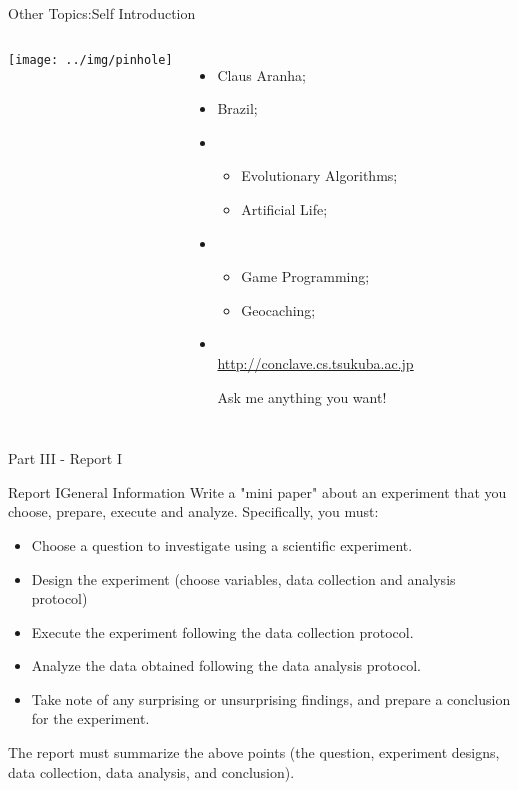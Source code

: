 \documentclass[aspectratio=169]{beamer}
\begin{document}
\begin{frame}{Other Topics:}{Self Introduction}
  \begin{columns}
    \texttt{[image: ../img/pinhole]}
    {\small
    \begin{itemize}
      \item {} Claus Aranha;
      \item {} Brazil;
      \item {}
      \begin{itemize}
        \item Evolutionary Algorithms;
        \item Artificial Life;
      \end{itemize}
      \item {}
      \begin{itemize}
        \item Game Programming;
        \item Geocaching;
      \end{itemize}
        \smallskip

      \item {}\\
      {\smaller \url{http://conclave.cs.tsukuba.ac.jp}}
      \medskip

      Ask me anything you want!
    \end{itemize}
    }
  \end{columns}
\end{frame}

\begin{frame}{}
  \begin{center}
    Part III - Report I
  \end{center}
\end{frame}

\begin{frame}{Report I}{General Information}
  Write a "mini paper" about an experiment that you choose, prepare, execute and analyze. Specifically, you must:\medskip

  \begin{itemize}
    \item Choose a question to investigate using a scientific experiment.
    \item Design the experiment (choose variables, data collection and analysis protocol)
    \item Execute the experiment following the data collection protocol.
    \item Analyze the data obtained following the data analysis protocol.
    \item Take note of any surprising or unsurprising findings, and prepare a conclusion for the experiment.
  \end{itemize}\medskip

  The report must summarize the above points (the question, experiment designs, data collection, data analysis, and conclusion).
\end{frame}
\end{document}
